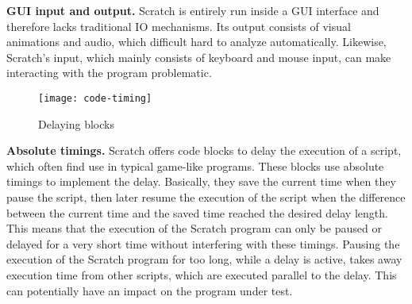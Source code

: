 \textbf{GUI input and output.}
Scratch is entirely run inside a GUI interface and therefore lacks traditional IO mechanisms.
Its output consists of visual animations and audio, which difficult hard to analyze automatically.
Likewise, Scratch's input, which mainly consists of keyboard and mouse input, can make interacting with the program problematic.

\begin{wrapfigure}{r}{0.25\textwidth + 5mm}
    \centering
    \vspace{-6mm}
    \texttt{[image: code-timing]}
    \vspace{-3mm}
    \caption{Delaying blocks}
    \label{fig:delaying_blocks}
\end{wrapfigure}

\textbf{Absolute timings.}
Scratch offers code blocks to delay the execution of a script, which often find use in typical game-like programs.
These blocks use absolute timings to implement the delay.
Basically, they save the current time when they pause the script,
then later resume the execution of the script when the difference between the current time and the saved time reached the desired delay length.
This means that the execution of the Scratch program can only be paused or delayed for a very short time without interfering with these timings.
Pausing the execution of the Scratch program for too long, while a delay is active,
takes away execution time from other scripts, which are executed parallel to the delay.
This can potentially have an impact on the program under test.

